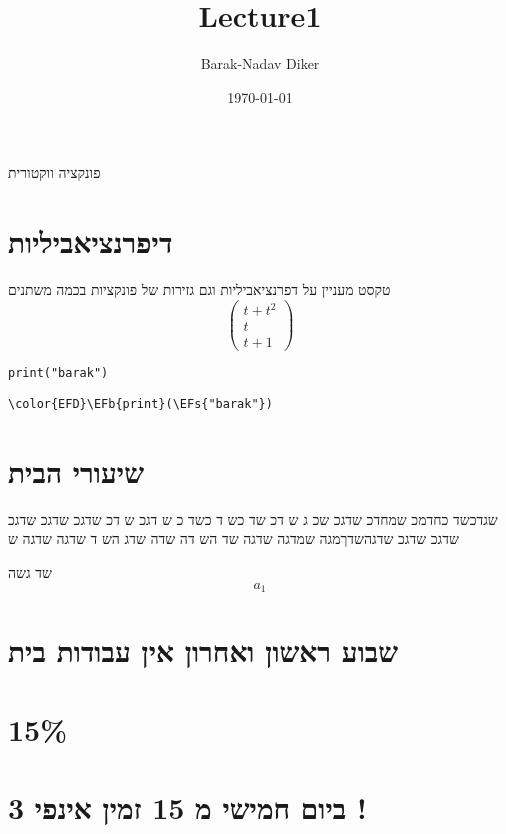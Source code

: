 \documentclass[11pt]{article}
\author{Barak-Nadav Diker}
\date{\today}
\title{Lecture1}
\newcommand{\EFs}[1]{\textcolor{EFs}{#1}} %
\newcommand{\EFb}[1]{\textcolor{EFb}{#1}} %
\begin{document}
\maketitle
פונקציה ווקטורית
\section*{דיפרנציאביליות}
\label{sec:org9b3ac67}
טקסט מעניין על דפרנציאביליות וגם גזירות של פונקציות בכמה משתנים
\begin{equation}
\begin{pmatrix}
t + t^2 \\
t \\
t + 1 
\end{pmatrix}
\end{equation}



\begin{verbatim}
print("barak")
\end{verbatim}

\begin{Code}
\begin{Verbatim}
\color{EFD}\EFb{print}(\EFs{"barak"})
\end{Verbatim}
\end{Code}
\section*{שיעורי הבית}
\label{sec:org262aa7b}
שגדכשד כחדמכ שמחדכ שדגכ שכ
ג ש
דכ שד כש
ד כשד
כ ש
דגכ ש
דכ
שדגכ שדגכ שדגכ שדגכ שדגכ שדגהשדךמגה שמדגה שדגה שד
הש
דה שדה שדג הש
ד
שדגה שדגה ש

שד גשה
\begin{equation}
a_1
\end{equation}
\section*{שבוע ראשון ואחרון אין עבודות בית}
\label{sec:org5b809bf}
\section*{15\%}
\label{sec:org909d05d}
\section*{ביום חמישי מ 15 זמין אינפי 3 !}
\label{sec:org3384332}
\end{document}
